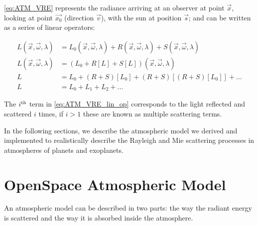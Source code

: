 \documentclass[journal]{vgtc}                %
\newcommand{\anderscomment}[1]{\textbf{[AY~} \textcolor{cyan}{#1} \textbf{~]}}
\begin{document}
\autoref{eq:ATM_VRE} represents the radiance arriving at an observer at point $\vec{x}$, looking at point $\vec{x_0}$ (direction $\vec{v}$), with the sun at position $\vec{s}$; and can be written as a series of linear operators:

\vspace*{-3.5mm}
{
  \small
\begin{align}
L(\vec{x},\vec{\omega}, \lambda) &= L_0(\vec{x}, \vec{\omega}, \lambda) + R(\vec{x}, \vec{\omega}, \lambda) + S(\vec{x}, \vec{\omega}, \lambda)\nonumber\\ 
L(\vec{x},\vec{\omega}, \lambda) &= (L_0 + R[L] + S[L])(\vec{x},\vec{\omega}, \lambda)\nonumber\\
L &= L_0 + (R + S)[L_0] + (R + S)[(R + S)[L_0]] + \ldots \nonumber\\
L &= L_0 + L_1 + L_2 + \ldots \label{eq:ATM_VRE_lin_op}
\end{align}
}
\vspace*{-5mm}

The $i^\textnormal{th}$ term in \autoref{eq:ATM_VRE_lin_op} corresponds to the light reflected and scattered $i$ times, if $i > 1$ these are known as multiple scattering terms.
 
In the following sections, we describe the atmospheric model we derived and implemented to realistically describe the Rayleigh and Mie scattering processes in atmospheres of planets and exoplanets.
\section{OpenSpace Atmospheric Model}\label{sec:method}

An atmospheric model can be described in two parts: the way the radiant energy is scattered and the way it is absorbed inside the atmosphere.
\end{document}
